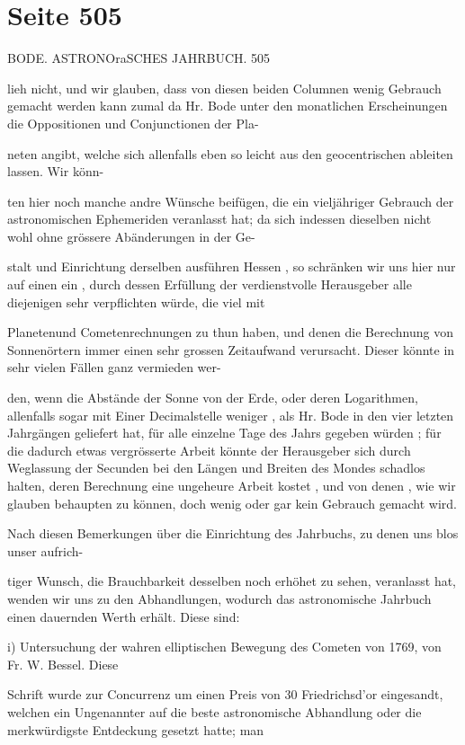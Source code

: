 \documentclass[10pt,a4paper]{article}
\begin{document}
\section*{Seite 505}
BODE. ASTRONOraSCHES JAHRBUCH. 505

lieh nicht, und wir glauben, dass von diesen beiden Columnen wenig Gebrauch gemacht werden kann zumal da Hr. Bode unter den monatlichen Erscheinungen die Oppositionen und Conjunctionen der Pla-

neten angibt, welche sich allenfalls eben so leicht aus den geocentrischen ableiten lassen. Wir könn-

ten hier noch manche andre Wünsche beifügen, die ein vieljähriger Gebrauch der astronomischen Ephemeriden veranlasst hat; da sich indessen dieselben nicht wohl ohne grössere Abänderungen in der Ge-

stalt und Einrichtung derselben ausführen Hessen , so schränken wir uns hier nur auf einen ein , durch dessen Erfüllung der verdienstvolle Herausgeber alle diejenigen sehr verpflichten würde, die viel mit

Planetenund Cometenrechnungen zu thun haben, und denen die Berechnung von Sonnenörtern immer einen sehr grossen Zeitaufwand verursacht. Dieser könnte in sehr vielen Fällen ganz vermieden wer-

den, wenn die Abstände der Sonne von der Erde, oder deren Logarithmen, allenfalls sogar mit Einer Decimalstelle weniger , als Hr. Bode in den vier letzten Jahrgängen geliefert hat, für alle einzelne Tage des Jahrs gegeben würden ; für die dadurch etwas vergrösserte Arbeit könnte der Herausgeber sich durch Weglassung der Secunden bei den Längen und Breiten des Mondes schadlos halten, deren Berechnung eine ungeheure Arbeit kostet , und von denen , wie wir glauben behaupten zu können, doch wenig oder gar kein Gebrauch gemacht wird.

Nach diesen Bemerkungen über die Einrichtung des Jahrbuchs, zu denen uns blos unser aufrich-

tiger Wunsch, die Brauchbarkeit desselben noch erhöhet zu sehen, veranlasst hat, wenden wir uns zu den Abhandlungen, wodurch das astronomische Jahrbuch einen dauernden Werth erhält. Diese sind:

i) Untersuchung der wahren elliptischen Bewegung des Cometen von 1769, von Fr. W. Bessel. Diese

Schrift wurde zur Concurrenz um einen Preis von 30 Friedrichsd'or eingesandt, welchen ein Ungenannter auf die beste astronomische Abhandlung oder die merkwürdigste Entdeckung gesetzt hatte; man
\end{document}

